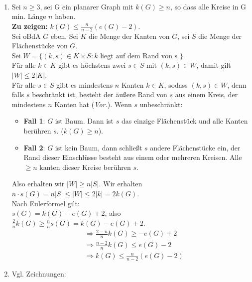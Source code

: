 \begin{solution}
  \
  \begin{enumerate}[label= (\alph*)] 
    \item Sei \( n \geq 3 \), sei G ein planarer Graph mit \( k(G) \geq n \), so dass alle Kreise in G min. Länge \( n \) haben. \\
    \textbf{Zu zeigen:} \( k(G) \leq \frac{n}{n-2}(e(G) - 2) \). \\
    Sei oBdA \( G \) eben. Sei \( K \) die Menge der Kanten von \( G \), sei \( S \) die Menge der Flächenstücke von \( G \). \\
    Sei \( W = \{ (k,s) \in K \times S : k \text{ liegt auf dem Rand von s } \} \). \\
    Für alle \( k \in K \) gibt es höchstens zwei \( s \in S \) mit \( (k,s) \in W \), damit gilt \( \vert W \vert \leq 2 \vert K \vert \). \\
    Für alle \( s \in S \) gibt es mindestens \( n \) Kanten \( k \in K \), sodass \( (k,s) \in W \), denn falls \( s \) beschränkt ist, besteht der äußere Rand von \( s \) aus einem Kreis, der mindestens \( n \) Kanten hat (\emph{Vor.}). Wenn \( s \) unbeschränkt:
    \begin{itemize}
      \item \textbf{Fall 1}: \( G \) ist Baum. Dann ist \( s \) das einzige Flächenstück und alle Kanten berühren \( s \). (\( k(G) \geq n \)).
      \item \textbf{Fall 2}: \( G \) ist kein Baum, dann schließt \( s \) andere Flächenstücke ein, der Rand dieser Einschlüsse besteht aus einem oder mehreren Kreisen. Alle \( \geq n \) kanten dieser Kreise berühren \( s \).
    \end{itemize} 
    Also erhalten wir \( \vert W \vert \geq n \vert S \vert \). Wir erhalten \( n \cdot s(G) = n\vert S \vert \leq \vert W \vert \leq 2 \vert k \vert = 2k(G) \). \\
    Nach Eulerformel gilt: \\
    \( s(G) = k(G) - e(G) + 2 \), also \( \frac{2}{n}k(G) \geq \frac{n}{n} s(G) = k(G) - e(G) + 2 \).
    \begin{align*}
      &\Rightarrow \frac{2-n}{n}k(G) \geq - e(G) + 2 \\
      &\Rightarrow \frac{n-2}{n}k(G) \leq e(G) - 2 \\
      &\Rightarrow k(G) \leq \frac{n}{n-2}(e(G) - 2)
    \end{align*}
    \item Vgl. Zeichnungen:
    \begin{figure}[H]

\end{figure}
\end{enumerate}
\end{solution}
